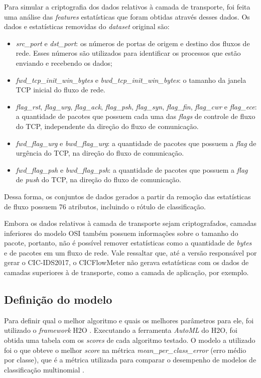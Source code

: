 \documentclass[12pt]{article}
\begin{document}
Para simular a criptografia dos dados relativos à camada de transporte, foi feita uma análise das \textit{features} estatísticas que foram obtidas através desses dados. Os dados e estatísticas removidas do \textit{dataset} original são:

\begin{itemize}
    \item \emph{src\_port} e \emph{dst\_port}: os números de portas de origem e destino dos fluxos de rede. Esses números são utilizados para identificar os processos que estão enviando e recebendo os dados;
    \item \emph{fwd\_tcp\_init\_win\_bytes} e \emph{bwd\_tcp\_init\_win\_bytes}: o tamanho da janela TCP inicial do fluxo de rede.
    \item \emph{flag\_rst}, \emph{flag\_urg}, \emph{flag\_ack}, \emph{flag\_psh}, \emph{flag\_syn}, \emph{flag\_fin}, \emph{flag\_cwr} e \emph{flag\_ece}: a quantidade de pacotes que possuem cada uma das \emph{flags} de controle de fluxo do TCP, independente da direção do fluxo de comunicação.
    \item \emph{fwd\_flag\_urg} e \emph{bwd\_flag\_urg}: a quantidade de pacotes que possuem a \emph{flag} de urgência do TCP, na direção do fluxo de comunicação.
    \item \emph{fwd\_flag\_psh} e \emph{bwd\_flag\_psh}: a quantidade de pacotes que possuem a \emph{flag} de \emph{push} do TCP, na direção do fluxo de comunicação.
\end{itemize}

Dessa forma, os conjuntos de dados gerados a partir da remoção das estatísticas de fluxo possuem 76 atributos, incluindo o rótulo de classificação.

Embora os dados relativos à camada de transporte sejam criptografados, camadas inferiores do modelo OSI também possuem informações sobre o tamanho do pacote, portanto, não é possível remover estatísticas como a quantidade de \emph{bytes} e de pacotes em um fluxo de rede. Vale ressaltar que, até a versão responsável por gerar o CIC-IDS2017, o CICFlowMeter não gerava estatísticas com os dados de camadas superiores à de transporte, como a camada de aplicação, por exemplo.

\subsection{Definição do modelo}
\label{sec:modelo}

Para definir qual o melhor algoritmo e quais os melhores parâmetros para ele, foi utilizado o \emph{framework} H2O \cite{h2oai}. Executando a ferramenta \emph{AutoML} do H2O, foi obtida uma tabela com os \emph{scores} de cada algoritmo testado. O modelo a utilizado foi o que obteve o melhor \emph{score} na métrica \emph{mean\_per\_class\_error} (erro médio por classe), que é a métrica utilizada para comparar o desempenho de modelos de classificação multinomial \cite{h2oai}.
\end{document}
